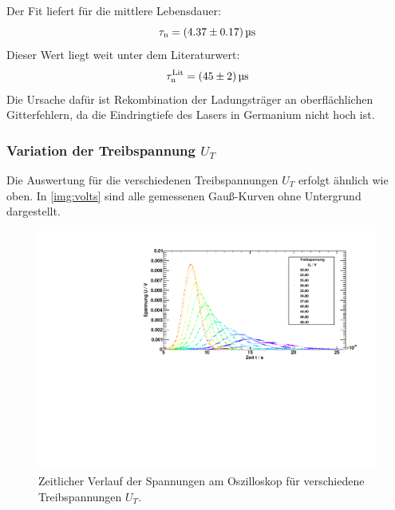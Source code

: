 Der Fit liefert für die mittlere Lebensdauer:
\begin{equation}
  \tau_\text{n} = (4.37 \pm 0.17)\,\text{\textmu s}
\end{equation}
Dieser Wert liegt weit unter dem Literaturwert: 
\begin{equation}
  \tau_\text{n}^\text{Lit} = (45 \pm 2)\,\text{\textmu s}
\end{equation}
Die Ursache dafür ist Rekombination der Ladungsträger an oberflächlichen Gitterfehlern,
da die Eindringtiefe des Lasers in Germanium nicht hoch ist.

\subsubsection{Variation der Treibspannung \texorpdfstring{$U_T$}{U\_T}}
Die Auswertung für die verschiedenen Treibspannungen $U_T$ erfolgt ähnlich wie oben. In \autoref{img:volts} sind alle gemessenen Gauß-Kurven 
ohne Untergrund dargestellt.
\begin{figure}[H]
\begin{center}
  \includegraphics[width=\textwidth]{../img/part2/voltages.pdf}
  \caption{Zeitlicher Verlauf der Spannungen am Oszilloskop für verschiedene Treibspannungen $U_T$.}
  \label{img:volts}
\end{center}
\end{figure}

